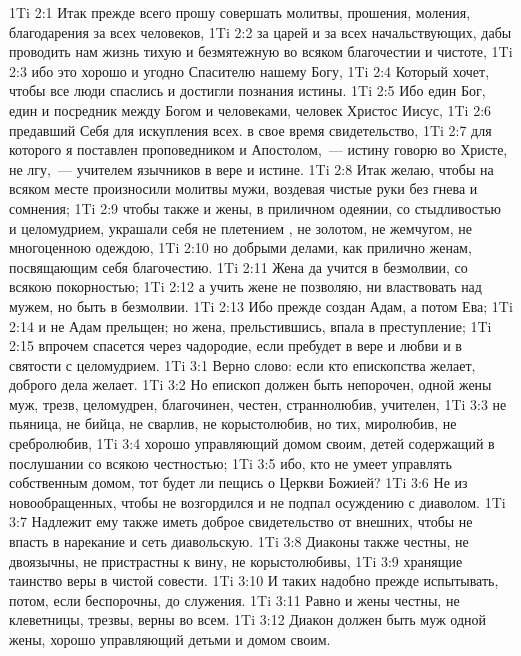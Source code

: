 \vs 1Ti 2:1 Итак прежде всего прошу совершать молитвы, прошения, моления, благодарения за всех человеков,
\vs 1Ti 2:2 за царей и за всех начальствующих, дабы проводить нам жизнь тихую и безмятежную во всяком благочестии и чистоте,
\vs 1Ti 2:3 ибо это хорошо и угодно Спасителю нашему Богу,
\vs 1Ti 2:4 Который хочет, чтобы все люди спаслись и достигли познания истины.
\vs 1Ti 2:5 Ибо един Бог, един и посредник между Богом и человеками, человек Христос Иисус,
\vs 1Ti 2:6 предавший Себя для искупления всех.  в свое время свидетельство,
\vs 1Ti 2:7 для которого я поставлен проповедником и Апостолом,~--- истину говорю во Христе, не лгу,~--- учителем язычников в вере и истине.
\rsbpar\vs 1Ti 2:8 Итак желаю, чтобы на всяком месте произносили молитвы мужи, воздевая чистые руки без гнева и сомнения;
\vs 1Ti 2:9 чтобы также и жены, в приличном одеянии, со стыдливостью и целомудрием, украшали себя не плетением , не золотом, не жемчугом, не многоценною одеждою,
\vs 1Ti 2:10 но добрыми делами, как прилично женам, посвящающим себя благочестию.
\vs 1Ti 2:11 Жена да учится в безмолвии, со всякою покорностью;
\vs 1Ti 2:12 а учить жене не позволяю, ни властвовать над мужем, но быть в безмолвии.
\vs 1Ti 2:13 Ибо прежде создан Адам, а потом Ева;
\vs 1Ti 2:14 и не Адам прельщен; но жена, прельстившись, впала в преступление;
\vs 1Ti 2:15 впрочем спасется через чадородие, если пребудет в вере и любви и в святости с целомудрием.
\vs 1Ti 3:1 Верно слово: если кто епископства желает, доброго дела желает.
\vs 1Ti 3:2 Но епископ должен быть непорочен, одной жены муж, трезв, целомудрен, благочинен, честен, страннолюбив, учителен,
\vs 1Ti 3:3 не пьяница, не бийца, не сварлив, не корыстолюбив, но тих, миролюбив, не сребролюбив,
\vs 1Ti 3:4 хорошо управляющий домом своим, детей содержащий в послушании со всякою честностью;
\vs 1Ti 3:5 ибо, кто не умеет управлять собственным домом, тот будет ли пещись о Церкви Божией?
\vs 1Ti 3:6 Не  из новообращенных, чтобы не возгордился и не подпал осуждению с диаволом.
\vs 1Ti 3:7 Надлежит ему также иметь доброе свидетельство от внешних, чтобы не впасть в нарекание и сеть диавольскую.
\vs 1Ti 3:8 Диаконы также  честны, не двоязычны, не пристрастны к вину, не корыстолюбивы,
\vs 1Ti 3:9 хранящие таинство веры в чистой совести.
\vs 1Ti 3:10 И таких надобно прежде испытывать, потом, если беспорочны,  до служения.
\vs 1Ti 3:11 Равно и жены  честны, не клеветницы, трезвы, верны во всем.
\vs 1Ti 3:12 Диакон должен быть муж одной жены, хорошо управляющий детьми и домом своим.
